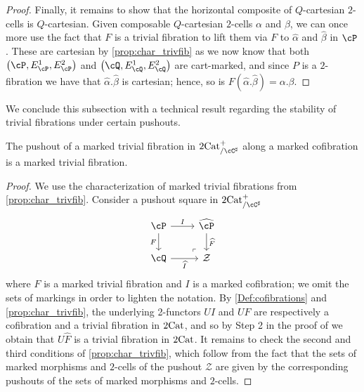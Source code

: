 \documentclass[11pt, dvipsnames]{amsart}
\begin{document}
\begin{proof}
			Finally, it remains to show that the horizontal composite of $Q$-cartesian $2$-cells is $Q$-cartesian. Given composable $Q$-cartesian $2$-cells $\alpha$ and $\beta$, we can once more use the fact that $F$ is a trivial fibration to lift them via $F$ to $\widehat\alpha$ and $\widehat\beta$ in $\cP$. These are cartesian by \cref{prop:char_trivfib} as we now know that both $\markedscat{\cP}$ and $\markedscat{\cQ}$ are cart-marked, and since $P$ is a $2$-fibration we have that $\widehat\alpha.\widehat\beta$ is cartesian; hence, so is $F(\widehat\alpha.\widehat\beta) = \alpha.\beta$.
		\end{proof}

        We conclude this subsection with a technical result regarding the stability of trivial fibrations under certain pushouts.

		\begin{prop}\label{Prop:pushout_tf_along_cofib} 
			The pushout of a marked trivial fibration in $\twocat^{+}_{/\cC^\sharp}$ along a marked cofibration is a marked trivial fibration.
		\end{prop}

		\begin{proof}
		We use the characterization of marked trivial fibrations from \cref{prop:char_trivfib}. Consider a pushout square in $\twocat^{+}_{/\cC^\sharp}$
		\[\begin{tikzcd}
			\cP & {\widehat{\cP}} \\
			\cQ & \mathcal{Z}
			\arrow["I", from=1-1, to=1-2]
			\arrow["F"', from=1-1, to=2-1]
			\arrow["{\widehat{F}}", from=1-2, to=2-2]
			\arrow["{\widehat{I}}"', from=2-1, to=2-2]
			\arrow["\lrcorner"{anchor=center, pos=0.125, rotate=180}, draw=none, from=2-2, to=1-1]
		\end{tikzcd}\]
		where $F$ is a marked trivial fibration and $I$ is a marked cofibration; we omit the sets of markings in order to lighten the notation. By \cref{Def:cofibrations} and \cref{prop:char_trivfib}, the underlying 2-functors  $UI$ and $UF$ are respectively a cofibration and a trivial fibration in $2\mathrm{Cat}$, and so by Step 2 in the proof of \cite[Theorem 6.3]{Lack2002} we obtain that $U\widehat{F}$ is a trivial fibration in $2\mathrm{Cat}$. It remains to check the second and third conditions of \cref{prop:char_trivfib}, which follow from the fact that the sets of marked morphisms and $2$-cells of the pushout $\mathcal{Z}$ are given by the corresponding pushouts of the sets of marked morphisms and $2$-cells. 
		\end{proof}
\end{document}
